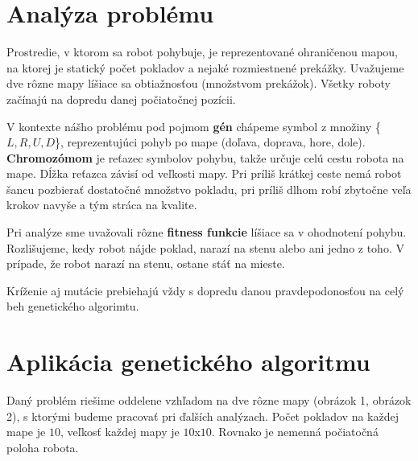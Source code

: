 \documentclass[10pt]{paper}
\begin{document}
\newpage

\section{Analýza problému}

Prostredie, v ktorom sa robot pohybuje, je reprezentované ohraničenou mapou, na ktorej je statický počet pokladov a nejaké rozmiestnené prekážky. Uvažujeme dve rôzne mapy líšiace sa obtiažnosťou (množstvom prekážok). Všetky roboty začínajú na dopredu danej počiatočnej pozícii.

V kontexte nášho problému pod pojmom \textbf{gén} chápeme symbol z množiny \{$L, R, U, D$\}, reprezentujúci pohyb po mape (doľava, doprava, hore, dole). \textbf{Chromozómom} je reťazec symbolov pohybu, takže určuje celú cestu robota na mape. Dĺžka reťazca závisí od veľkosti mapy. Pri príliš krátkej ceste nemá robot šancu pozbierať dostatočné množstvo pokladu, pri príliš dlhom robí zbytočne veľa krokov navyše a tým stráca na kvalite. 

Pri analýze sme uvažovali rôzne \textbf{fitness funkcie} líšiace sa v ohodnotení pohybu. Rozlišujeme, kedy robot nájde poklad, narazí na stenu alebo ani jedno z toho. V prípade, že robot narazí na stenu, ostane stáť na mieste.

Kríženie aj mutácie prebiehajú vždy s dopredu danou pravdepodonosťou na celý beh genetického algorimtu.

\section{Aplikácia genetického algoritmu}
Daný problém riešime oddelene vzhľadom na dve rôzne mapy (obrázok 1, obrázok 2), s ktorými budeme pracovať pri ďalších analýzach. Počet pokladov na každej mape je $10$, veľkosť každej mapy je $10$x$10$. Rovnako je nemenná počiatočná poloha robota.
\end{document}
